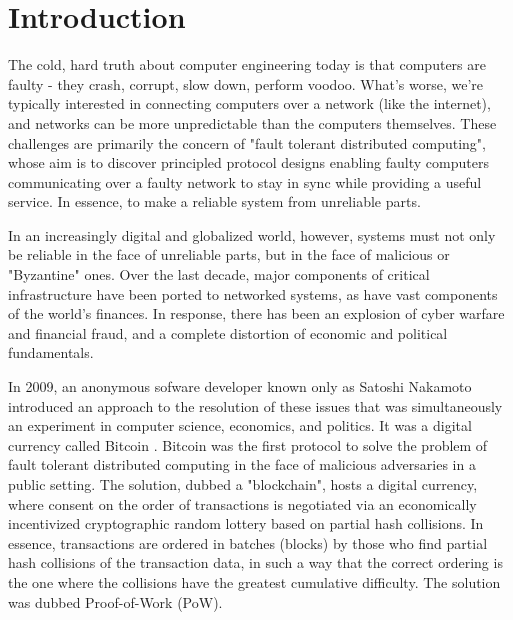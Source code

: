 \chapter{Introduction}
\label{ch:intro}

The cold, hard truth about computer engineering today is that computers are faulty - 
they crash, corrupt, slow down, perform voodoo. 
What's worse, we're typically interested in connecting computers over a network (like the internet),
and networks can be more unpredictable than the computers themselves.
These challenges are primarily the concern of "fault tolerant distributed computing",
whose aim is to discover principled protocol designs enabling faulty computers communicating over a faulty network 
to stay in sync while providing a useful service.
In essence, to make a reliable system from unreliable parts.

In an increasingly digital and globalized world, however, 
systems must not only be reliable in the face of unreliable parts, but in the face of malicious or "Byzantine" ones.
Over the last decade, major components of critical infrastructure have been ported to networked systems,
as have vast components of the world's finances.
In response, there has been an explosion of cyber warfare and financial fraud,
and a complete distortion of economic and political fundamentals.

In 2009, an anonymous sofware developer known only as Satoshi Nakamoto introduced an approach to the resolution of these issues 
that was simultaneously an experiment in computer science, economics, and politics. 
It was a digital currency called Bitcoin \cite{bitcoin}.
Bitcoin was the first protocol to solve the problem of fault tolerant distributed computing in the face of malicious adversaries in a public setting.
The solution, dubbed a "blockchain", hosts a digital currency, 
where consent on the order of transactions is negotiated via an economically incentivized cryptographic random lottery based on partial hash collisions.
In essence, transactions are ordered in batches (blocks) by those who find partial hash collisions of the transaction data, 
in such a way that the correct ordering is the one where the collisions have the greatest cumulative difficulty.
The solution was dubbed Proof-of-Work (PoW).

